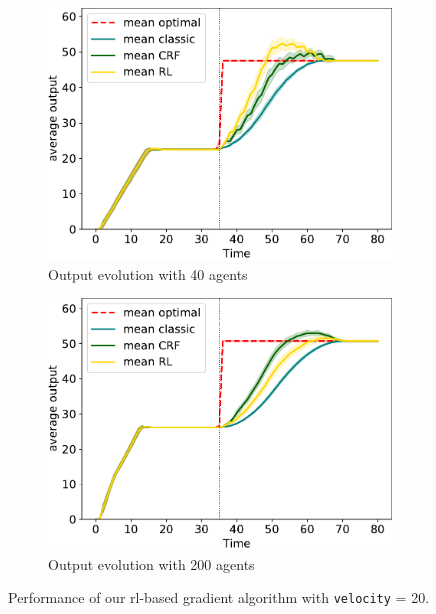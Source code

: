 \begin{figure}[t!]
  \begin{subfigure}[t]{\figfactor\textwidth}
    \centering
    \includegraphics[width=\textwidth]{papers/coordination2022/img/output-few-nodes.pdf}
    \caption{Output evolution with 40 agents}
    \label{subfig:output-few}
  \end{subfigure}
  \hfill
  \begin{subfigure}[t]{\figfactor\textwidth}
    \centering
    \includegraphics[width=\textwidth]{papers/coordination2022/img/output-many-nodes.pdf}
    \caption{Output evolution with 200 agents}
    \label{subfig:output-many}
  \end{subfigure}
  \caption{Performance of our \ac{rl}-based gradient algorithm with \lstinline|velocity| = 20.
  }
  \label{fig:eval}
\end{figure}